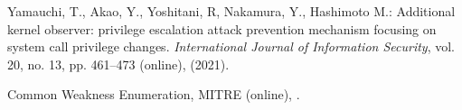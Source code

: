 \documentclass[english,sigrecommended,JIP]{ipsj}
\begin{document}
\begin{thebibliography}{99}
  Yamauchi, T., Akao, Y., Yoshitani, R, Nakamura, Y., Hashimoto M.: Additional kernel observer: privilege escalation attack prevention mechanism focusing on system call privilege changes. \textit{International Journal of Information Security}, vol. 20, no. 13, pp. 461--473 (online),  (2021).

  Common Weakness Enumeration, MITRE (online),  .


\end{thebibliography}
\end{document}
